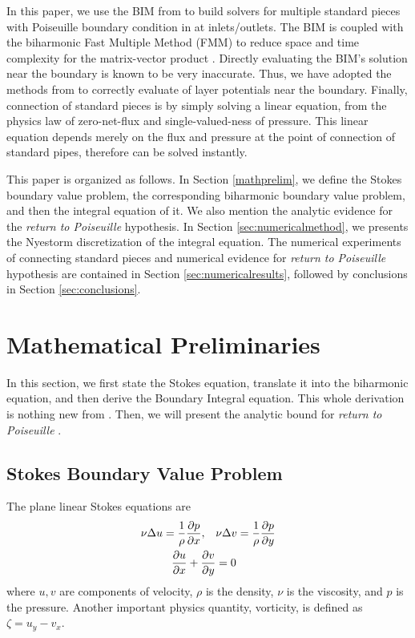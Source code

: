 \documentclass[10pt,twocolumn]{article}
\begin{document}
In this paper, we use the BIM from 
\cite{greengardIntegralEquationMethods1996} to build solvers for multiple standard pieces with Poiseuille boundary condition in at inlets/outlets. 
The BIM is coupled with the biharmonic Fast Multiple Method (FMM) 
to reduce space and time complexity for the matrix-vector product \cite{FlatironinstituteFmm2d2022}.
Directly evaluating the BIM's solution near the boundary is known to be very inaccurate.
Thus, we have adopted the methods from 
\cite{wuSolutionStokesFlow2020,helsingEvaluationLayerPotentials2008} 
to correctly evaluate of layer potentials near the boundary. 
Finally, connection of standard pieces is by simply solving a linear equation, 
from the physics law of zero-net-flux and single-valued-ness of pressure. 
This linear equation depends merely on the flux and pressure at the
point of connection of standard pipes, therefore can be solved instantly. 

This paper is organized as follows. In Section \ref{mathprelim}, we define the Stokes boundary value problem, 
the corresponding biharmonic boundary value problem, and then the integral equation of it. 
We also mention the analytic evidence for the \textit{return to Poiseuille} hypothesis. In Section \ref{sec:numericalmethod}, we presents the Nyestorm discretization
of the integral equation. 
The numerical experiments of connecting standard pieces and numerical evidence for \textit{return to Poiseuille}
hypothesis are contained in Section \ref{sec:numericalresults}, 
followed by conclusions in Section \ref{sec:conclusions}.

\section{Mathematical Preliminaries\label{mathprelim}}

In this section, we first state the Stokes equation, translate it into the biharmonic equation, 
and then derive the Boundary Integral equation. This whole derivation is nothing new from \cite{greengardIntegralEquationMethods1996}. 
Then, we will present the analytic bound for \textit{return to Poiseuille} \cite{gregoryTractionBoundaryValue1980}. 

\subsection{Stokes Boundary Value Problem}

The plane linear Stokes equations are
\begin{align}
  \nu \Delta u = \frac 1 \rho \pdv{p}{x},\quad &\nu \Delta v = \frac 1\rho \pdv{p}{y} 
  \label{stokes} \\
  \pdv{u}{x} + \pdv{v}{y} &= 0
  \label{continuity}
\end{align}
where $u,v$ are components of velocity, 
$\rho$ is the density, 
$\nu$ is the viscosity, 
and $p$ is the pressure. 
Another important physics quantity, vorticity, is defined as $\zeta  = u_y - v_x$. 
\end{document}
